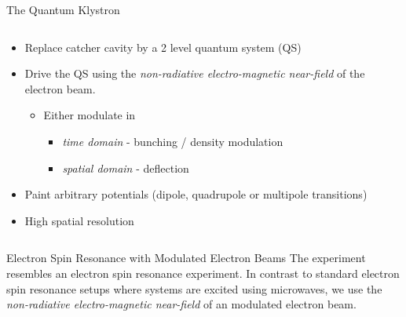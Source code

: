 \documentclass[final]{beamer}
\begin{document}
\begin{frame}[fragile]{}
\begin{columns}[T]
\begin{column}{.49\linewidth}
\begin{block}{\Large The Quantum Klystron}
\begin{columns}
\begin{column}{0.55\columnwidth}
            \begin{itemize}
              \item Replace catcher cavity by a 2 level quantum system (QS)
              \item Drive the QS using the \textit{non-radiative electro-magnetic near-field}
                    of the electron beam.
              \begin{itemize}
                \item Either modulate in
                \begin{itemize}
                    \item \textit{time domain} - bunching / density modulation
                    \item \textit{spatial domain} - deflection
                \end{itemize}
              \end{itemize}
              \item Paint arbitrary potentials (dipole, quadrupole or multipole transitions)
              \item High spatial resolution %
            \end{itemize}
          \end{column}
        \end{columns}
      \end{block}

      \begin{block}{\Large Electron Spin Resonance with Modulated Electron Beams}
        The experiment resembles an electron spin resonance experiment. In contrast to
        standard electron spin resonance setups where systems are excited using microwaves,
        we use the \textit{non-radiative electro-magnetic near-field} of an modulated electron beam.


\end{block}
\end{column}
\end{columns}
\end{frame}
\end{document}
